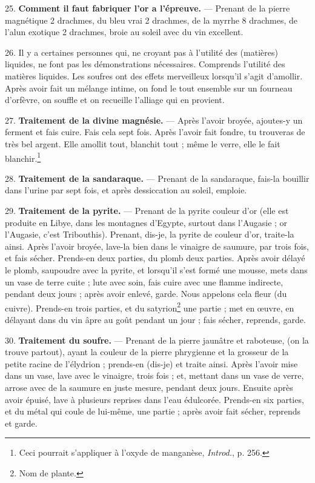 \documentclass[a4paper, 11pt, oneside, polutonikogreek, french]{article}
\begin{document}
25. \textbf{Comment il faut fabriquer l'or a l'épreuve.} --- Prenant de la pierre magnétique 2 drachmes, du bleu vrai 2 drachmes, de la myrrhe 8 drachmes, de l'alun exotique 2 drachmes, broie au soleil avec du vin excellent.

26. Il y a certaines personnes qui, ne croyant pas à l'utilité des (matières) liquides, ne font pas les démonstrations nécessaires. Comprends l'utilité des matières liquides. Les soufres ont des effets merveilleux lorsqu'il s'agit d'amollir. Après avoir fait un mélange intime, on fond le tout ensemble sur un fourneau d'orfèvre, on souffle et on recueille l'alliage qui en provient.

27. \textbf{Traitement de la divine magnésie.} --- Après l'avoir broyée, ajoutes-y un ferment et fais cuire. Fais cela sept fois. Après l'avoir fait fondre, tu trouveras de très bel argent. Elle amollit tout, blanchit tout ; même le verre, elle le fait blanchir.\footnote{Ceci pourrait s'appliquer à l'oxyde de manganèse, \emph{Introd.}, p. 256.}

28. \textbf{Traitement de la sandaraque.} --- Prenant de la sandaraque, fais-la bouillir dans l'urine par sept fois, et après dessiccation au soleil, emploie.

29. \textbf{Traitement de la pyrite.} --- Prenant de la pyrite couleur d'or (elle est produite en Libye, dans les montagnes d'Egypte, surtout dans l'Augasie ; or l'Augasie, c'est Tribouthis). Prenant, dis-je, la pyrite de couleur d'or, traite-la ainsi. Après l'avoir broyée, lave-la bien dans le vinaigre de saumure, par trois fois, et fais sécher. Prends-en deux parties, du plomb deux parties. Après avoir délayé le plomb, saupoudre avec la pyrite, et lorsqu'il s'est formé une mousse, mets dans un vase de terre cuite ; lute avec soin, fais cuire avec une flamme indirecte, pendant deux jours ; après avoir enlevé, garde. Nous appelons cela fleur (du cuivre). Prends-en trois parties, et du satyrion\footnote{Nom de plante.} une partie ; met en œuvre, en délayant dans du vin âpre au goût pendant un jour ; fais sécher, reprends, garde.

30. \textbf{Traitement du soufre.} --- Prenant de la pierre jaunâtre et raboteuse, (on la trouve partout), ayant la couleur de la pierre phrygienne et la grosseur de la petite racine de l'élydrion ; prends-en (dis-je) et traite ainsi. Après l'avoir mise dans un vase, lave avec le vinaigre, trois fois ; et, mettant dans un vase de verre, arrose avec de la saumure en juste mesure, pendant deux jours. Ensuite après avoir épuisé, lave à plusieurs reprises dans l'eau édulcorée. Prends-en six parties, et du métal qui coule de lui-même, une partie ; après avoir fait sécher, reprends et garde.
\end{document}
